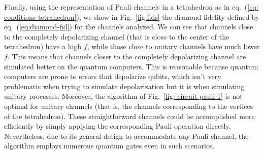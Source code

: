\documentclass[10pt,letterpaper]{article} %
\newcommand{\fref}[1]{Fig.~\ref{#1}}
\newcommand{\eref}[1]{eq.~(\ref{#1})}
\begin{document}
Finally, using the representation of Pauli channels in a tetrahedron as
in \eref{eq: conditions-tetrahedron},
we show in \fref{fig:fids} the diamond fidelity defined by \eref{eq:diamond-fid} for the channels
analyzed. 
We can see that channels close to the 
completely depolarizing
channel (that is close to the center of the tetrahedron)
have a high $f$, while those 
close to unitary channels have much lower $f$.
This means that channels closer to the 
completely depolarizing channel are simulated better on the quantum computers.
This is reasonable because quantum computers are prone to errors
that depolarize qubits, which isn't very problematic
when trying to simulate depolarization but it is 
when simulating unitary processes. Moreover, the algorithm of \fref{fig:
circuit-pauli-1} is not optimal for unitary channels (that is, the channels
corresponding to the vertices of the tetrahedron).  These straightforward
channels could be accomplished more efficiently by simply applying the
corresponding Pauli operation directly. Nevertheless, due to its general design
to accommodate any Pauli channel, the algorithm employs numerous quantum gates
even in such scenarios.
\end{document}
